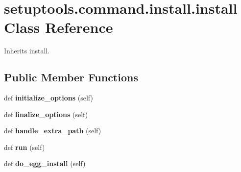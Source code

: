 \hypertarget{classsetuptools_1_1command_1_1install_1_1install}{}\section{setuptools.\+command.\+install.\+install Class Reference}
\label{classsetuptools_1_1command_1_1install_1_1install}


Inherits install.

\subsection*{Public Member Functions}
\begin{DoxyCompactItemize}
\item 
\mbox{\label{classsetuptools_1_1command_1_1install_1_1install_ae8b8774d2a59024777c3c2042121a0a6}} 
def {\bfseries initialize\+\_\+options} (self)
\item 
\mbox{\label{classsetuptools_1_1command_1_1install_1_1install_aa68ab08ede694260b838e49ad820732e}} 
def {\bfseries finalize\+\_\+options} (self)
\item 
\mbox{\label{classsetuptools_1_1command_1_1install_1_1install_a1621318085a84e482b1f20d48e74b590}} 
def {\bfseries handle\+\_\+extra\+\_\+path} (self)
\item 
\mbox{\label{classsetuptools_1_1command_1_1install_1_1install_a836001d2333653e5ee3163aa4c805e6e}} 
def {\bfseries run} (self)
\item 
\mbox{\label{classsetuptools_1_1command_1_1install_1_1install_a96fdffd6145de3296ee08ef3dd51ed2b}} 
def {\bfseries do\+\_\+egg\+\_\+install} (self)
\end{DoxyCompactItemize}
